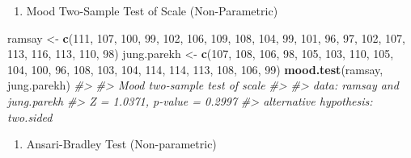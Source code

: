 \documentclass[
]{book}
\newenvironment{Shaded}{\begin{snugshade}}{\end{snugshade}}
\newcommand{\CommentTok}[1]{\textcolor[rgb]{0.56,0.35,0.01}{\textit{#1}}}
\newcommand{\DecValTok}[1]{\textcolor[rgb]{0.00,0.00,0.81}{#1}}
\newcommand{\FunctionTok}[1]{\textcolor[rgb]{0.13,0.29,0.53}{\textbf{#1}}}
\newcommand{\NormalTok}[1]{#1}
\newcommand{\OtherTok}[1]{\textcolor[rgb]{0.56,0.35,0.01}{#1}}
\providecommand{\tightlist}{%
  \setlength{\itemsep}{0pt}\setlength{\parskip}{0pt}}
\begin{document}
\begin{enumerate}
\def\labelenumi{\alph{enumi}.}
\setcounter{enumi}{3}
\tightlist
\item
  Mood Two-Sample Test of Scale (Non-Parametric)
\end{enumerate}

\begin{Shaded}
\begin{Highlighting}[]
\NormalTok{ramsay }\OtherTok{\textless{}{-}} \FunctionTok{c}\NormalTok{(}\DecValTok{111}\NormalTok{, }\DecValTok{107}\NormalTok{, }\DecValTok{100}\NormalTok{, }\DecValTok{99}\NormalTok{, }\DecValTok{102}\NormalTok{, }\DecValTok{106}\NormalTok{, }\DecValTok{109}\NormalTok{, }\DecValTok{108}\NormalTok{, }\DecValTok{104}\NormalTok{, }\DecValTok{99}\NormalTok{,}
            \DecValTok{101}\NormalTok{, }\DecValTok{96}\NormalTok{, }\DecValTok{97}\NormalTok{, }\DecValTok{102}\NormalTok{, }\DecValTok{107}\NormalTok{, }\DecValTok{113}\NormalTok{, }\DecValTok{116}\NormalTok{, }\DecValTok{113}\NormalTok{, }\DecValTok{110}\NormalTok{, }\DecValTok{98}\NormalTok{)}
\NormalTok{jung.parekh }\OtherTok{\textless{}{-}} \FunctionTok{c}\NormalTok{(}\DecValTok{107}\NormalTok{, }\DecValTok{108}\NormalTok{, }\DecValTok{106}\NormalTok{, }\DecValTok{98}\NormalTok{, }\DecValTok{105}\NormalTok{, }\DecValTok{103}\NormalTok{, }\DecValTok{110}\NormalTok{, }\DecValTok{105}\NormalTok{, }\DecValTok{104}\NormalTok{,}
            \DecValTok{100}\NormalTok{, }\DecValTok{96}\NormalTok{, }\DecValTok{108}\NormalTok{, }\DecValTok{103}\NormalTok{, }\DecValTok{104}\NormalTok{, }\DecValTok{114}\NormalTok{, }\DecValTok{114}\NormalTok{, }\DecValTok{113}\NormalTok{, }\DecValTok{108}\NormalTok{, }\DecValTok{106}\NormalTok{, }\DecValTok{99}\NormalTok{)}
\FunctionTok{mood.test}\NormalTok{(ramsay, jung.parekh)}
\CommentTok{\#\textgreater{} }
\CommentTok{\#\textgreater{}  Mood two{-}sample test of scale}
\CommentTok{\#\textgreater{} }
\CommentTok{\#\textgreater{} data:  ramsay and jung.parekh}
\CommentTok{\#\textgreater{} Z = 1.0371, p{-}value = 0.2997}
\CommentTok{\#\textgreater{} alternative hypothesis: two.sided}
\end{Highlighting}
\end{Shaded}

\begin{enumerate}
\def\labelenumi{\alph{enumi}.}
\setcounter{enumi}{4}
\tightlist
\item
  Ansari-Bradley Test (Non-parametric)
\end{enumerate}
\end{document}
